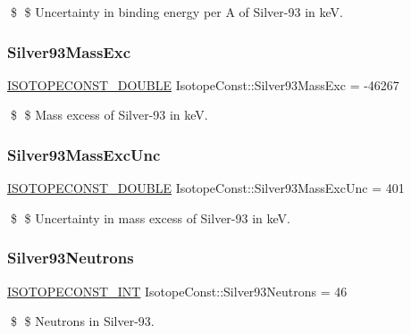 \$ \$ Uncertainty in binding energy per A of Silver-\/93 in keV. \mbox{\label{group___isotope_const-_silver-_ag93_ga3a9fd09e7885fd458ecd348ccd31b3c0}} 
\subsubsection{\texorpdfstring{Silver93\+Mass\+Exc}{Silver93MassExc}}
{\footnotesize\ttfamily \mbox{\hyperlink{group___isotope_const-_macros_ga8f45a7272ce02c0b4c65c44636ed719a}{I\+S\+O\+T\+O\+P\+E\+C\+O\+N\+S\+T\+\_\+\+D\+O\+U\+B\+LE}} Isotope\+Const\+::\+Silver93\+Mass\+Exc = -\/46267}

\$ \$ Mass excess of Silver-\/93 in keV. \mbox{\label{group___isotope_const-_silver-_ag93_gaacc17a307a8e547c6e974df65560539f}} 
\subsubsection{\texorpdfstring{Silver93\+Mass\+Exc\+Unc}{Silver93MassExcUnc}}
{\footnotesize\ttfamily \mbox{\hyperlink{group___isotope_const-_macros_ga8f45a7272ce02c0b4c65c44636ed719a}{I\+S\+O\+T\+O\+P\+E\+C\+O\+N\+S\+T\+\_\+\+D\+O\+U\+B\+LE}} Isotope\+Const\+::\+Silver93\+Mass\+Exc\+Unc = 401}

\$ \$ Uncertainty in mass excess of Silver-\/93 in keV. \mbox{\label{group___isotope_const-_silver-_ag93_gac3f70b5f29c69863099dc9c34214051d}} 
\subsubsection{\texorpdfstring{Silver93\+Neutrons}{Silver93Neutrons}}
{\footnotesize\ttfamily \mbox{\hyperlink{group___isotope_const-_macros_ga5f18360b3e99483a35c32d789e62621c}{I\+S\+O\+T\+O\+P\+E\+C\+O\+N\+S\+T\+\_\+\+I\+NT}} Isotope\+Const\+::\+Silver93\+Neutrons = 46}

\$ \$ Neutrons in Silver-\/93. \mbox{\label{group___isotope_const-_silver-_ag93_ga20bc406972eeec35b0e2ea1c9bd510ef}} 
